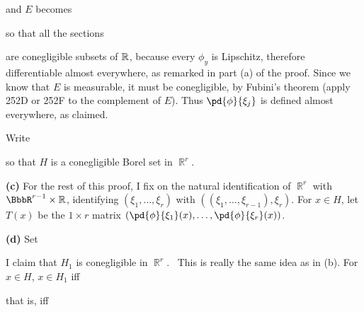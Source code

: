 {

\noindent and $E$ becomes


\noindent so that all the sections


\noindent are conegligible subsets of $\Bbb R$, because every
$\phi_y$ is Lipschitz, therefore differentiable almost everywhere, as
remarked in part (a) of the proof.   Since we know that $E$ is
measurable, it must be conegligible, by Fubini's theorem (apply 252D or
252F to the complement of $E$).
Thus $\pd{\phi}{\xi_j}$ is defined almost everywhere, as claimed.\ \Qed

Write


\noindent so that $H$ is a conegligible Borel set in $\BbbR^r$.

\medskip

{\bf (c)} For the rest of this proof, I fix on the natural
identification of $\BbbR^r$ with $\BbbR^{r-1}\times\Bbb R$,
identifying $(\xi_1,\ldots,\xi_r)$ with
$((\xi_1,\ldots,\xi_{r-1}),\xi_r)$.
For $x\in H$, let $T(x)$ be the $1\times r$ matrix
$(\pd{\phi}{\xi_1}(x),\ldots,\pd{\phi}{\xi_r}(x))$.

\medskip

{\bf (d)} Set


\noindent I claim that $H_1$ is conegligible in $\BbbR^r$.
\Prf\ This is really the same idea as in (b).   For $x\in H$, $x\in H_1$
iff


\noindent that is, iff


}
